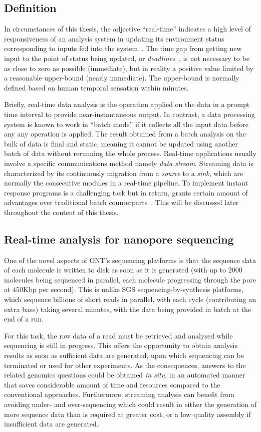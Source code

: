 \subsection{Definition}
In circumstances of this thesis, the adjective ``real-time'' indicates  a high level of responsiveness of an analysis system in updating its environment status corresponding to inputs fed into the system~\cite{Phillips1966programming}.
The time gap from getting new input to the point of status being updated, or \emph{deadlines}~\cite{Ben2006principles}, is not necessary to be as close to zero as possible (immediate), but in reality a positive value limited by a reasonable upper-bound (nearly immediate).
The upper-bound is normally defined based on human temporal sensation \EG{} within minutes.

Briefly, real-time data analysis is the operation applied on the data in a prompt time interval to provide near-instantaneous output.
In contrast, a data processing system is known to work in ``batch mode'' if it collects all the input data before any any operation is applied. 
The result obtained from a batch analysis on the bulk of data is final and static, meaning it cannot be updated using another batch of data without rerunning the whole process.
Real-time applications usually involve a specific communications method namely \emph{data stream}. Streaming data is characterized by its continuously migration from a \emph{source} to a \emph{sink}, which are normally the consecutive modules in a real-time pipeline.
To implement instant response programs is a challenging task but in return, grants certain amount of advantages over traditional batch counterparts~\cite{Croushore2011frontiers}. 
This will be discussed later throughout the content of this thesis.
\subsection{Real-time analysis for nanopore sequencing}
One of the novel aspects of ONT's sequencing platforms is that the sequence data of each molecule is written to disk as soon as it is generated (with up to 2000 molecules being sequenced in parallel, each molecule progressing through the pore at $450$Kbp per second).    This is unlike SGS sequencing-by-synthesis platforms, which sequence billions of short reads in parallel, with each cycle (contributing an extra base) taking several minutes, with the data being provided in batch at the end of a run.

For this task, the raw data of a read must be retrieved and analysed while sequencing is still in progress. This offers the opportunity to obtain analysis results as soon as sufficient data are generated, upon which sequencing can be terminated or used for other experiments.
As the consequences, answers to the related genomics questions could be obtained \emph{in situ}, in an automated manner that saves considerable amount of time and resources compared to the conventional approaches.
Furthermore, streaming analysis can benefit from avoiding under- and over-sequencing which could result in either the generation of more sequence data than is required at greater cost, or a low quality assembly if insufficient data are generated. 

